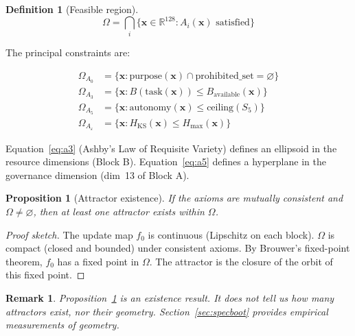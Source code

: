 \documentclass[11pt, a4paper]{article}
\newtheorem{proposition}[theorem]{Proposition}
\newtheorem{definition}{Definition}
\newtheorem{remark}{Remark}
\newcommand{\R}{\mathbb{R}}
\newcommand{\sv}{\bm{x}}
\begin{document}
\begin{definition}[Feasible region]
\label{def:omega}
\begin{equation}
  \Omega = \bigcap_i \bigl\{ \sv \in \R^{128} : A_i(\sv) \text{ satisfied} \bigr\}
\end{equation}
\end{definition}

The principal constraints are:

\begin{align}
  \Omega_{A_0}  &= \bigl\{ \sv : \mathrm{purpose}(\sv) \cap \mathrm{prohibited\_set} = \varnothing \bigr\}
  \label{eq:a0} \\
  \Omega_{A_3}  &= \bigl\{ \sv : B(\mathrm{task}(\sv)) \le B_\text{available}(\sv) \bigr\}
  \label{eq:a3} \\
  \Omega_{A_5}  &= \bigl\{ \sv : \mathrm{autonomy}(\sv) \le \mathrm{ceiling}(S_5) \bigr\}
  \label{eq:a5} \\
  \Omega_{A_\varepsilon} &= \bigl\{ \sv : H_\text{KS}(\sv) \le H_\text{max}(\sv) \bigr\}
  \label{eq:ae}
\end{align}

Equation~\eqref{eq:a3} (Ashby's Law of Requisite Variety) defines an
ellipsoid in the resource dimensions (Block B).
Equation~\eqref{eq:a5} defines a hyperplane in the governance dimension
(dim~13 of Block A).

\begin{proposition}[Attractor existence]
\label{prop:existence}
If the axioms are mutually consistent and $\Omega \neq \varnothing$,
then at least one attractor exists within $\Omega$.
\end{proposition}

\begin{proof}[Proof sketch]
The update map $f_0$ is continuous (Lipschitz on each block).
$\Omega$ is compact (closed and bounded) under consistent axioms.
By Brouwer's fixed-point theorem, $f_0$ has a fixed point in $\Omega$.
The attractor is the closure of the orbit of this fixed point.
\end{proof}

\begin{remark}
Proposition~\ref{prop:existence} is an existence result.
It does not tell us how many attractors exist, nor their geometry.
Section~\ref{sec:specboot} provides empirical measurements of geometry.
\end{remark}


\end{document}
